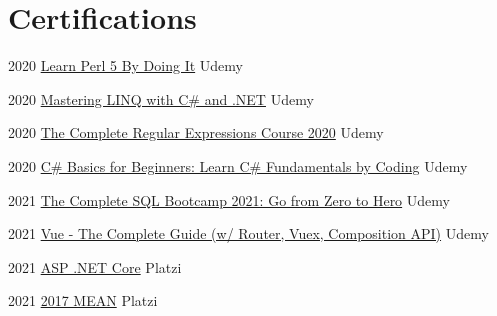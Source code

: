 \documentclass[letterpaper]{twentysecondcv} %
\begin{document}
\section{Certifications}
{
    \begin{twenty}
        
        
        \twentyitem
        {2020}
        {\href{http://ude.my/UC-8b854042-ac78-4c5b-a412-65ba63899017}
            {Learn Perl 5 By Doing It}
        }
        {Udemy}
        {}
    
        
        
        \twentyitem
        {2020}
        {\href{http://ude.my/UC-cdbb0eb7-1152-42f4-883d-d267f2b7adf7}
            {Mastering LINQ with C\# and .NET}
        }
        {Udemy}
        {}
    
        \twentyitem
        {2020}
        {\href{http://ude.my/UC-c10e41d9-1c6f-44e5-9426-d4c40e385673}
            {The Complete Regular Expressions Course 2020}
        }
        {Udemy}
        {}
        
        \twentyitem
        {2020}
        {\href{http://ude.my/UC-d913aaf2-7f89-43bf-ab2d-a6d0192fd784}
            {C\# Basics for Beginners: Learn C\# Fundamentals by Coding}
        }
        {Udemy}
        {}
        
        \twentyitem
        {2021}
        {\href{http://ude.my/UC-a276cfba-5873-4f08-892b-ecd564b69cc7}
            {The Complete SQL Bootcamp 2021: Go from Zero to Hero}
        }
        {Udemy}
        {}
        
        \twentyitem
        {2021}
        {\href{http://ude.my/UC-6739b136-b8be-4568-ad89-7fd19bc0096d}
            {Vue - The Complete Guide (w/ Router, Vuex, Composition API)}}
        {Udemy}
        {}
        
        \twentyitem
        {2021}
        {\href{https://platzi.com/p/camurillo582/curso/1395-course/diploma/detalle}
            {ASP .NET Core}
        }
        {Platzi}
        {}
        
        \twentyitem
        {2021}
        {\href{https://platzi.com/p/camurillo582/curso/1182-mean-2017/diploma/detalle/}
            {2017 MEAN}
        }
        {Platzi}
        {}
        

\end{twenty}}
\end{document}
